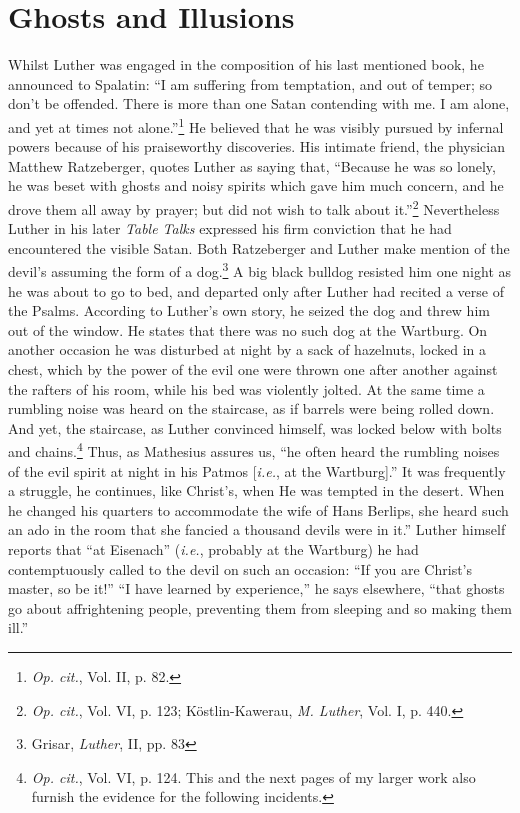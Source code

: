 \section{Ghosts and Illusions}

Whilst Luther was engaged in the composition of his last mentioned book,
he announced to Spalatin: “I am suffering from
temptation, and out of temper; so don’t be offended. There is more
than one Satan contending with me. I am alone, and yet at times not
alone.”\footnote{\textit{Op. cit.}, Vol. II, p. 82.}
He believed that he was visibly pursued by infernal powers
because of his praiseworthy discoveries. His intimate friend, the
physician Matthew Ratzeberger, quotes Luther as saying that, “Because he
was so lonely, he was beset with ghosts and noisy spirits
which gave him much concern, and he drove them all away by prayer;
but did not wish to talk about it.”\footnote{\textit{Op. cit.}, Vol. VI, p. 123; Köstlin-Kawerau, \textit{M. Luther}, Vol. I, p. 440.}
Nevertheless Luther in his later \textit{Table Talks} expressed his firm
conviction that he had encountered the visible Satan. Both Ratzeberger
and Luther make mention of the devil’s assuming the form of
a dog.\footnote{Grisar, \textit{Luther}, II, pp. 83}
A big black bulldog resisted him one night as he was about
to go to bed, and departed only after Luther had recited a verse of
the Psalms. According to Luther’s own story, he seized the dog
and threw him out of the window. He states that there was no such
dog at the Wartburg. On another occasion he was disturbed at night
by a sack of hazelnuts, locked in a chest, which by the power of the
evil one were thrown one after another against the rafters of his room,
while his bed was violently jolted. At the same time a rumbling noise
was heard on the staircase, as if barrels were being rolled down. And
yet, the staircase, as Luther convinced himself, was locked below with
bolts and chains.\footnote
{\textit{Op. cit.}, Vol. VI, p. 124. This and the next pages of my larger work also furnish the
evidence for the following incidents.}
Thus, as Mathesius assures us, ``he often heard the
rumbling noises of the evil spirit at night in his Patmos [\textit{i.e.}, at the
Wartburg].'' It was frequently a struggle, he continues, like Christ’s,
when He was tempted in the desert. When he changed his quarters to
accommodate the wife of Hans Berlips, she heard such an ado in the
room that she fancied a thousand devils were in it.” Luther himself
reports that “at Eisenach” (\textit{i.e.}, probably at the Wartburg) he had
contemptuously called to the devil on such an occasion: “If you are
Christ’s master, so be it!” “I have learned by experience,” he says
elsewhere, “that ghosts go about affrightening people, preventing
them from sleeping and so making them ill.”

